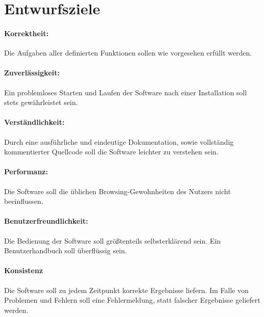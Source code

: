 \documentclass[11pt]{scrreprt}
\begin{document}
\section{Entwurfsziele}
\paragraph{Korrektheit:} Die Aufgaben aller definierten Funktionen sollen wie vorgesehen erfüllt werden.

\paragraph{Zuverlässigkeit:} Ein problemloses Starten und Laufen der Software nach einer Installation soll stets gewährleistet sein.

\paragraph{Verständlichkeit:} Durch eine ausführliche und eindeutige Dokumentation, sowie vollständig kommentierter Quellcode soll die Software leichter zu verstehen sein.

\paragraph{Performanz:} Die Software soll die üblichen Browsing-Gewohnheiten des Nutzers nicht beeinflussen.

\paragraph{Benutzerfreundlichkeit:} Die Bedienung der Software soll größtenteils selbsterklärend sein. Ein Benutzerhandbuch soll überflüssig sein.

\paragraph{Konsistenz} Die Software soll zu jedem Zeitpunkt korrekte Ergebnisse liefern. Im Falle von Problemen und Fehlern soll eine Fehlermeldung, statt falscher Ergebnisse geliefert werden.
\end{document}
